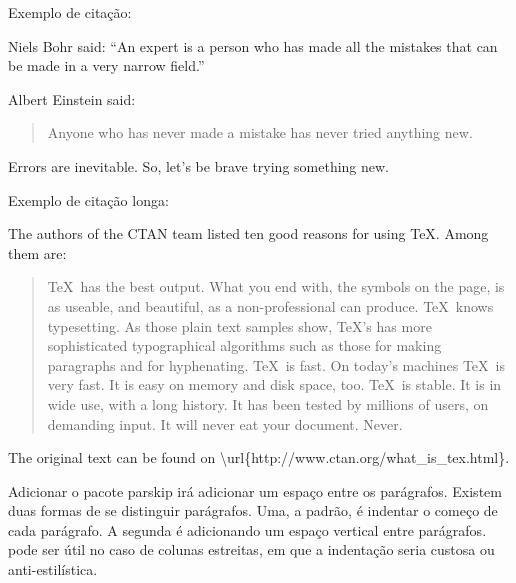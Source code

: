 \documentclass{article}
\begin{document}
Exemplo de citação:

Niels Bohr said: ``An expert is a person who has made
all the mistakes that can be made in a very narrow field.''

Albert Einstein said:

\begin{quote}
    Anyone who has never made a mistake has never tried anything new.
\end{quote}
Errors are inevitable. So, let's be brave trying something new.


Exemplo de citação longa:

The authors of the CTAN team listed ten good reasons
for using \TeX. Among them are:
\begin{quotation}
 \TeX\ has the best output. What you end with,
the symbols on the page, is as useable, and beautiful,
as a non-professional can produce.
 \TeX\ knows typesetting. As those plain text samples
show, \TeX's has more sophisticated typographical algorithms
such as those for making paragraphs and for hyphenating.
 \TeX\ is fast. On today's machines \TeX\ is very fast.
 It is easy on memory and disk space, too.
 \TeX\ is stable. It is in wide use, with a long history.
 It has been tested by millions of users, on demanding input.
 It will never eat your document. Never.
\end{quotation}
The original text can be found on
\textbackslash url\{http://www.ctan.org/what\_is\_tex.html\}.

Adicionar o pacote parskip irá adicionar um espaço entre os parágrafos.
Existem duas formas de se distinguir parágrafos.
Uma, a padrão, é indentar o começo de cada parágrafo.
A segunda é adicionando um espaço vertical entre parágrafos.
pode ser útil no caso de colunas estreitas, em que a indentação seria custosa ou anti-estilística.
\end{document}
